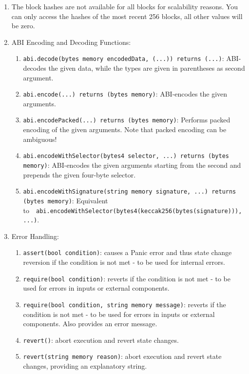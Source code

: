 \begin{enumerate}
\item The block hashes are not available for all blocks for scalability reasons. You can only access the hashes of the most recent 256 blocks, all other values will be zero.

\item ABI Encoding and Decoding Functions:
    \begin{enumerate}
    \item\verb|abi.decode(bytes memory encodedData, (...)) returns (...)|: ABI-decodes the given data, while the types are given in parentheses as second argument.
    \item\verb|abi.encode(...) returns (bytes memory)|: ABI-encodes the given arguments.
    \item\verb|abi.encodePacked(...) returns (bytes memory)|: Performs packed encoding of the given arguments. Note that packed encoding can be ambiguous!
    \item\verb|abi.encodeWithSelector(bytes4 selector, ...) returns (bytes memory)|: ABI-encodes the given arguments starting from the second and prepends the given four-byte selector.
    \item\verb|abi.encodeWithSignature(string memory signature, ...) returns (bytes memory)|: Equivalent to~\hspace{20cm}~\linebreak\verb|abi.encodeWithSelector(bytes4(keccak256(bytes(signature))), ...)|.
    \end{enumerate}

\item Error Handling:
    \begin{enumerate}
    \item\verb|assert(bool condition)|: causes a Panic error and thus state change reversion if the condition is not met - to be used for internal errors.
    \item\verb|require(bool condition)|: reverts if the condition is not met - to be used for errors in inputs or external components.
    \item\verb|require(bool condition, string memory message)|: reverts if the condition is not met - to be used for errors in inputs or external components. Also provides an error message.
    \item\verb|revert()|: abort execution and revert state changes.
    \item\verb|revert(string memory reason)|: abort execution and revert state changes, providing an explanatory string.
    \end{enumerate}


\end{enumerate}
